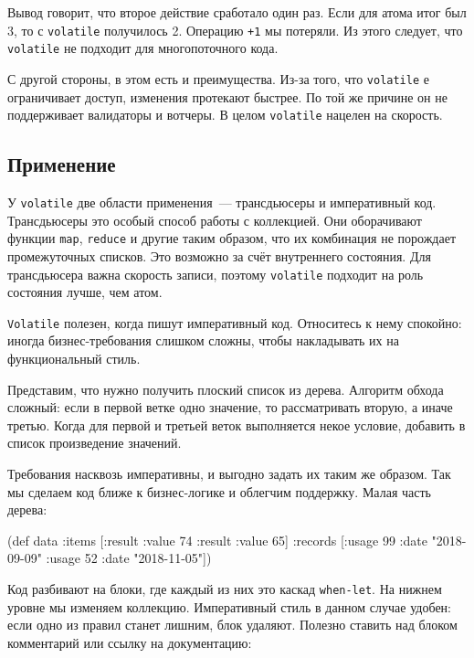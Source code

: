 Вывод говорит, что второе действие сработало один раз. Если для атома итог был
3, то с \verb|volatile| получилось 2. Операцию \verb|+1| мы потеряли. Из
этого следует, что \verb|volatile| не подходит для многопоточного кода.

С другой стороны, в этом есть и преимущества. Из-за того, что \verb|volatile|
е ограничивает доступ, изменения протекают быстрее. По той же причине он не
поддерживает валидаторы и вотчеры. В целом \verb|volatile| нацелен на
скорость.

\subsection{Применение}


У \verb|volatile| две области применения~--- трансдьюсеры и императивный
код. Трансдьюсеры это особый способ работы с коллекцией. Они оборачивают функции
\verb|map|, \verb|reduce| и другие таким образом, что их комбинация не
порождает промежуточных списков. Это возможно за счёт внутреннего состояния. Для
трансдьюсера важна скорость записи, поэтому \verb|volatile| подходит на роль
состояния лучше, чем атом.

\verb|Volatile| полезен, когда пишут императивный код. Относитесь к нему
спокойно: иногда бизнес-требования слишком сложны, чтобы накладывать их на
функциональный стиль.

Представим, что нужно получить плоский список из дерева. Алгоритм обхода
сложный: если в первой ветке одно значение, то рассматривать вторую, а иначе
третью. Когда для первой и третьей веток выполняется некое условие, добавить в
список произведение значений.


Требования насквозь императивны, и выгодно задать их таким же образом. Так мы
сделаем код ближе к бизнес-логике и облегчим поддержку. Малая часть дерева:

\begin{english}
  \begin{clojure}
(def data
  {:items [{:result {:value 74}}
           {:result {:value 65}}]
   :records [{:usage 99 :date "2018-09-09"}
             {:usage 52 :date "2018-11-05"}]})
  \end{clojure}
\end{english}

Код разбивают на блоки, где каждый из них это каскад \verb|when-let|. На
нижнем уровне мы изменяем коллекцию. Императивный стиль в данном случае удобен:
если одно из правил станет лишним, блок удаляют. Полезно ставить над блоком
комментарий или ссылку на документацию:

